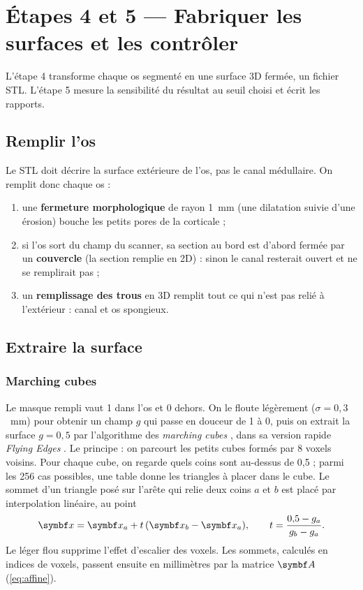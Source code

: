 \chapter{Étapes 4 et 5 — Fabriquer les surfaces et les contrôler}
\label{chap:maillage}

\begin{chapeau}
L'étape 4 transforme chaque os segmenté en une surface 3D fermée, un fichier STL. L'étape 5 mesure la sensibilité du
résultat au seuil choisi et écrit les rapports.
\end{chapeau}

\section{Remplir l'os}

Le STL doit décrire la surface extérieure de l'os, pas le canal médullaire. On remplit donc chaque os :
\begin{enumerate}
  \item une \textbf{fermeture morphologique} de rayon 1~mm (une dilatation suivie d'une érosion) bouche les petits
  pores de la corticale ;
  \item si l'os sort du champ du scanner, sa section au bord est d'abord fermée par un \textbf{couvercle} (la section
  remplie en 2D) : sinon le canal resterait ouvert et ne se remplirait pas ;
  \item un \textbf{remplissage des trous} en 3D remplit tout ce qui n'est pas relié à l'extérieur : canal et os
  spongieux.
\end{enumerate}

\section{Extraire la surface}

\subsection{Marching cubes}

Le masque rempli vaut 1 dans l'os et 0 dehors. On le floute légèrement ($\sigma = 0{,}3$~mm) pour obtenir un champ
$g$ qui passe en douceur de 1 à 0, puis on extrait la surface $g = 0{,}5$ par l'algorithme des \emph{marching cubes}
\cite{lorensen1987}, dans sa version rapide \emph{Flying Edges} \cite{schroeder2015}. Le principe : on parcourt les
petits cubes formés par 8 voxels voisins. Pour chaque cube, on regarde quels coins sont au-dessus de 0,5 ; parmi les
256 cas possibles, une table donne les triangles à placer dans le cube. Le sommet d'un triangle posé sur l'arête qui
relie deux coins $a$ et $b$ est placé par interpolation linéaire, au point
\begin{equation}
  \vb{x} = \vb{x}_a + t\,(\vb{x}_b - \vb{x}_a), \qquad t = \frac{0{,}5 - g_a}{g_b - g_a}.
\end{equation}
Le léger flou supprime l'effet d'escalier des voxels. Les sommets, calculés en indices de voxels, passent ensuite en
millimètres par la matrice $\mt{A}$ (\cref{eq:affine}).

